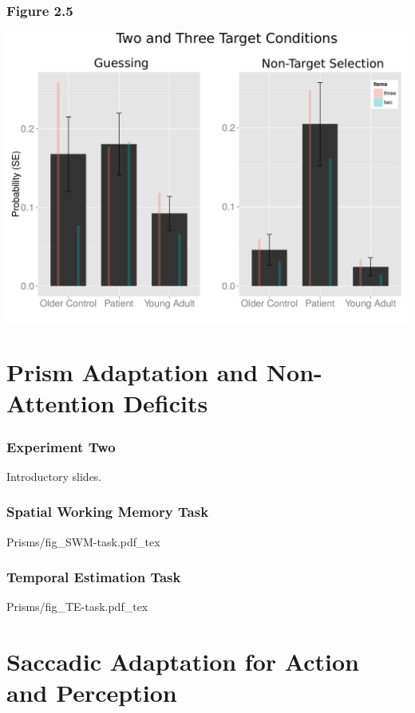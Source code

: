 \documentclass{beamer}
\begin{document}
 

 \section[Prisms]{Prism Adaptation and Non-Attention Deficits} 

 \begin{frame}
  \frametitle{Experiment Two}
 Introductory slides. 
 \end{frame}



  \begin{frame}
	 \frametitle{Spatial Working Memory Task}
  \def\svgwidth{0.7\textwidth}
  {Prisms/fig_SWM-task.pdf_tex}
 \end{frame}

  \begin{frame}
	 \frametitle{Temporal Estimation Task}
  \def\svgwidth{0.9\textwidth}
  {Prisms/fig_TE-task.pdf_tex}
 \end{frame}



\section[Saccadic Adaptation]{Saccadic Adaptation for Action and Perception} 
\end{document}
